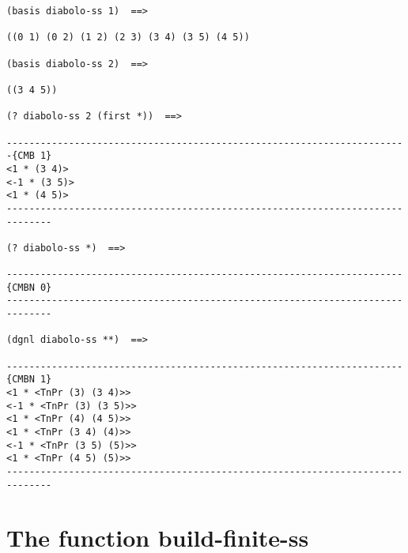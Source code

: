 {\footnotesize\begin{verbatim}
(basis diabolo-ss 1)  ==>

((0 1) (0 2) (1 2) (2 3) (3 4) (3 5) (4 5))

(basis diabolo-ss 2)  ==>

((3 4 5))

(? diabolo-ss 2 (first *))  ==>

-----------------------------------------------------------------------{CMB 1}
<1 * (3 4)>
<-1 * (3 5)>
<1 * (4 5)>
------------------------------------------------------------------------------

(? diabolo-ss *)  ==>

----------------------------------------------------------------------{CMBN 0}
------------------------------------------------------------------------------

(dgnl diabolo-ss **)  ==>

----------------------------------------------------------------------{CMBN 1}
<1 * <TnPr (3) (3 4)>>
<-1 * <TnPr (3) (3 5)>>
<1 * <TnPr (4) (4 5)>>
<1 * <TnPr (3 4) (4)>>
<-1 * <TnPr (3 5) (5)>>
<1 * <TnPr (4 5) (5)>>
------------------------------------------------------------------------------

\end{verbatim}}

\newpage

\section{The function build-finite-ss}

